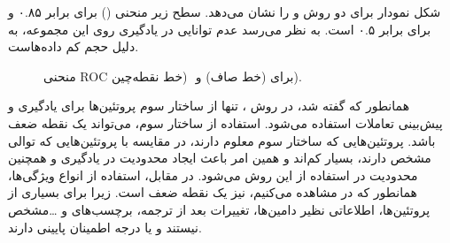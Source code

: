 شکل  نمودار  برای دو روش  و  را نشان می‌دهد. سطح زیر منحنی () برای  برابر ۰.۸۵ و برای  برابر ۰.۵ است. به نظر می‌رسد عدم توانایی  در یادگیری روی این مجموعه، به دلیل حجم کم داده‌هاست. 

\begin{figure}[ht]
\caption[منحنی ROC]{
منحنی 
‫{‬ROC‫}‬
برای 
 (خط صاف) و ‬
‫(‬خط نقطه‌چین).
}
\label{fig:roc-curve}
\end{figure}

همانطور که گفته شد، در روش ، تنها از ساختار سوم پروتئین‌ها برای یادگیری و پیش‌بینی تعاملات استفاده می‌شود. استفاده از ساختار سوم، می‌تواند یک نقطه ضعف باشد. پروتئین‌هایی که ساختار سوم معلوم دارند، در مقایسه با پروتئین‌هایی که توالی مشخص دارند، بسیار کم‌اند و همین امر باعث ایجاد محدودیت در یادگیری و همچنین محدودیت در استفاده از این روش می‌شود. در مقابل، استفاده از انواع ویژگی‌ها، همانطور که در  مشاهده می‌کنیم، نیز یک نقطه ضعف است. زیرا برای بسیاری از پروتئین‌ها، اطلاعاتی نظیر دامین‌ها، تغییرات بعد از ترجمه، برچسب‌های  و \ldots مشخص نیستند و یا درجه اطمینان پایینی دارند.

